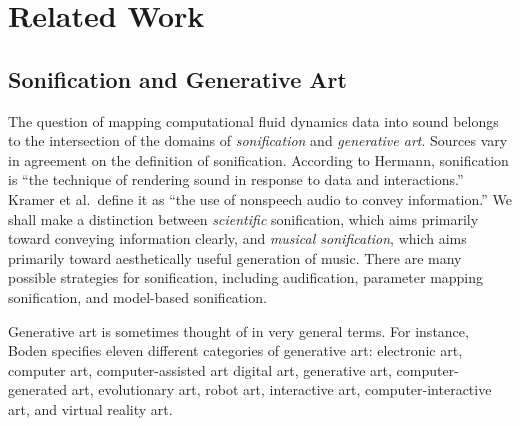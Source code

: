 \chapter[Related Work]{Related Work}
\section{Sonification and Generative Art}

The question of mapping computational fluid dynamics data into sound belongs to the intersection of the domains of {\em sonification} and {\em generative art}. Sources vary in agreement on the definition of sonification. According to Hermann, sonification is ``the technique of rendering sound in response to data and interactions.'' \cite{hermann2011sonification} Kramer et al.~define it as ``the use of nonspeech audio to convey information.'' \cite{kramer2010sonification} We shall make a distinction between {\em scientific} sonification, which aims primarily toward conveying information clearly, and {\em musical sonification}, which aims primarily toward aesthetically useful generation of music. There are many possible strategies for sonification, including audification, parameter mapping sonification, and model-based sonification. \cite{hermann2011sonification} 

Generative art is sometimes thought of in very general terms. For instance, Boden specifies eleven different categories of generative art: electronic art, computer art, computer-assisted art digital art, generative art, computer-generated art, evolutionary art, robot art, interactive art, computer-interactive art, and virtual reality art. \cite{boden2009generative}